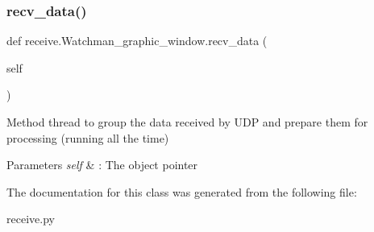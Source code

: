 \subsubsection{\texorpdfstring{recv\_data()}{recv\_data()}}
{\footnotesize\ttfamily def receive.\+Watchman\+\_\+graphic\+\_\+window.\+recv\+\_\+data (\begin{DoxyParamCaption}\item[{}]{self }\end{DoxyParamCaption})}



Method thread to group the data received by U\+DP and prepare them for processing (running all the time) 


\begin{DoxyParams}{Parameters}
{\em self} & \+: The object pointer \\
\hline
\end{DoxyParams}


The documentation for this class was generated from the following file\+:\begin{DoxyCompactItemize}
\item 
receive.\+py\end{DoxyCompactItemize}
